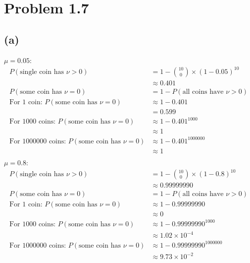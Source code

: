 \documentclass{article}
\begin{document}
	\section*{Problem 1.7}
	\subsection*{(a)}
		$\mu = 0.05$:
		\begin{align*}
			P(\text{single coin has } \nu > 0) &= 1 - {10 \choose 0}\times (1 - 0.05)^{10}\\
			&\approx 0.401\\
			P(\text{some coin has } \nu = 0) &= 1 - P(\text{all coins have } \nu > 0)\\
			\text{For 1 coin: }P(\text{some coin has } \nu = 0) &\approx 1 - 0.401\\
			&= \boxed{0.599}\\
			\text{For 1000 coins: } P(\text{some coin has } \nu = 0) &\approx 1 - 0.401^{1000}\\
			&\approx \boxed{1}\\
			\text{For 1000000 coins: } P(\text{some coin has } \nu = 0) &\approx 1 - 0.401^{1000000}\\
			&\approx \boxed{1}\\
		\end{align*}
		$\mu = 0.8$:
		\begin{align*}
			P(\text{single coin has } \nu > 0) &= 1 - {10 \choose 0}\times (1 - 0.8)^{10}\\
			&\approx 0.99999990\\
			P(\text{some coin has } \nu = 0) &= 1 - P(\text{all coins have } \nu > 0)\\
			\text{For 1 coin: }P(\text{some coin has } \nu = 0) &\approx 1 - 0.99999990\\
			&\approx \boxed{0}\\
			\text{For 1000 coins: } P(\text{some coin has } \nu = 0) &\approx 1 - 0.99999990^{1000}\\
			&\approx \boxed{1.02\times 10^{-4}}\\
			\text{For 1000000 coins: } P(\text{some coin has } \nu = 0) &\approx 1 - 0.99999990^{1000000}\\
			&\approx \boxed{9.73 \times 10^{-2}}\\
		\end{align*}
\end{document}
